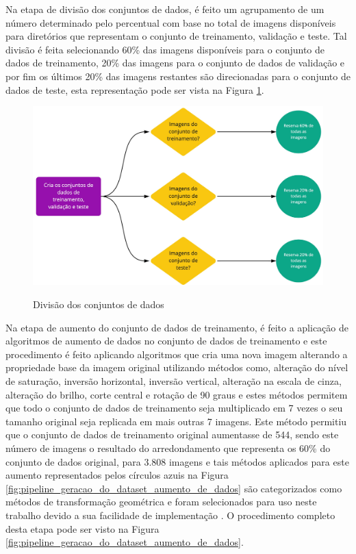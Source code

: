 \documentclass[
	12pt,				%
	oneside,			%
	a4paper,			%
	english,			%
	brazil				%
	]{abntex2ppgsi}
\begin{document}
Na etapa de divisão dos conjuntos de dados, é feito um agrupamento de um número determinado pelo percentual com base no total de imagens disponíveis para diretórios que representam o conjunto de treinamento, validação e teste. Tal divisão é feita selecionando 60\% das imagens disponíveis para o conjunto de dados de treinamento, 20\% das imagens para o conjunto de dados de validação e por fim os últimos 20\% das imagens restantes são direcionadas para o conjunto de dados de teste, esta representação pode ser vista na Figura \ref{fig:pipeline_geracao_do_dataset_divisao}.

\begin{figure}[H]
    \centering
    \caption{Divisão dos conjuntos de dados}
    \includegraphics[width=1.0\textwidth]{imagens/materiais_metodos/modulo_conjunto_dados/pipeline_geracao_do_dataset_divisao.jpg}
    \label{fig:pipeline_geracao_do_dataset_divisao}
\end{figure}

Na etapa de aumento do conjunto de dados de treinamento, é feito a aplicação de algoritmos de aumento de dados no conjunto de dados de treinamento e este procedimento é feito aplicando algoritmos que cria uma nova imagem alterando a propriedade base da imagem original utilizando métodos como, alteração do nível de saturação, inversão horizontal, inversão vertical, alteração na escala de cinza, alteração do brilho, corte central e rotação de 90 graus e estes métodos permitem que todo o conjunto de dados de treinamento seja multiplicado em 7 vezes o seu tamanho original seja replicada em mais outras 7 imagens. Este método permitiu que o conjunto de dados de treinamento original aumentasse de 544, sendo este número de imagens o resultado do arredondamento que representa os 60\% do conjunto de dados original, para 3.808 imagens e tais métodos aplicados para este aumento representados pelos círculos azuis na Figura \ref{fig:pipeline_geracao_do_dataset_aumento_de_dados} são categorizados como métodos de transformação geométrica e foram selecionados para uso neste trabalho devido a sua facilidade de implementação \cite{shorten2019survey}. O procedimento completo desta etapa pode ser visto na Figura \ref{fig:pipeline_geracao_do_dataset_aumento_de_dados}.
\end{document}
